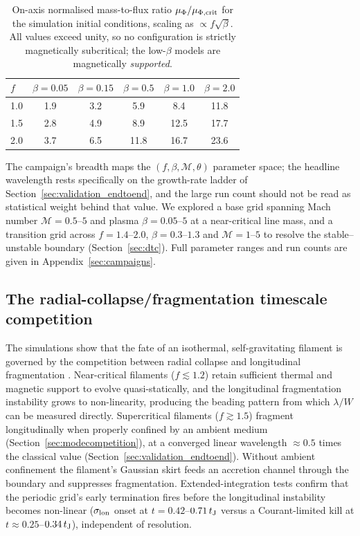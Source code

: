 \documentclass[usenatbib,twoside,twocolumn]{mnras}
\begin{document}
\begin{table}
\caption{On-axis normalised mass-to-flux ratio $\mu_\Phi/\mu_{\Phi,\rm crit}$ for the simulation initial conditions, scaling as $\propto f\sqrt{\beta}$. All values exceed unity, so no configuration is strictly magnetically subcritical; the low-$\beta$ models are magnetically \emph{supported}.}
\label{tab:massflux}
\footnotesize
\setlength{\tabcolsep}{4pt}
\begin{tabular}{lccccc}
\toprule
$f$ & $\beta{=}0.05$ & $\beta{=}0.15$ & $\beta{=}0.5$ & $\beta{=}1.0$ & $\beta{=}2.0$ \\
\midrule
1.0 & 1.9 & 3.2 & 5.9 & 8.4 & 11.8 \\
1.5 & 2.8 & 4.9 & 8.9 & 12.5 & 17.7 \\
2.0 & 3.7 & 6.5 & 11.8 & 16.7 & 23.6 \\
\bottomrule
\end{tabular}
\end{table}

The campaign's breadth maps the $(f,\beta,\mathcal{M},\theta)$ parameter space; the headline wavelength rests specifically on the growth-rate ladder of Section~\ref{sec:validation_endtoend}, and the large run count should not be read as statistical weight behind that value. We explored a base grid spanning Mach number $\mathcal{M}=0.5$--$5$ and plasma $\beta=0.05$--$5$ at a near-critical line mass, and a transition grid across $f=1.4$--$2.0$, $\beta=0.3$--$1.3$ and $\mathcal{M}=1$--$5$ to resolve the stable--unstable boundary (Section~\ref{sec:dtc}). Full parameter ranges and run counts are given in Appendix~\ref{sec:campaigns}.

\subsection{The radial-collapse/fragmentation timescale competition}
\label{sec:regimes}

The simulations show that the fate of an isothermal, self-gravitating filament is governed by the competition between radial collapse and longitudinal fragmentation \citep{Inutsuka1997, Pon2012}. Near-critical filaments ($f\lesssim1.2$) retain sufficient thermal and magnetic support to evolve quasi-statically, and the longitudinal fragmentation instability grows to non-linearity, producing the beading pattern from which $\lambda/W$ can be measured directly. Supercritical filaments ($f\gtrsim1.5$) fragment longitudinally when properly confined by an ambient medium (Section~\ref{sec:modecompetition}), at a converged linear wavelength $\approx0.5$ times the classical value (Section~\ref{sec:validation_endtoend}). Without ambient confinement the filament's Gaussian skirt feeds an accretion channel through the boundary and suppresses fragmentation. Extended-integration tests confirm that the periodic grid's early termination fires before the longitudinal instability becomes non-linear ($\sigma_{\rm lon}$ onset at $t=0.42$--$0.71\,t_{\rm J}$ versus a Courant-limited kill at $t\approx0.25$--$0.34\,t_{\rm J}$), independent of resolution.
\end{document}
